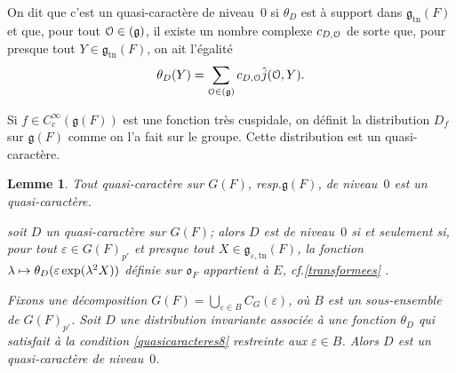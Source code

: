 \documentclass[11pt]{article}
\newcommand{\cf}{cf.\xspace}
\newcommand{\resp}{resp.\xspace}
\newcommand{\skpt}{\smallskip}
\numberwithin{equation}{section}\providecommand{\og}{«\,}\providecommand{\fg}{\,»}
\let\mathcal \EuScript
\let\oldenumerate\enumerate
\renewcommand{\enumerate}{\oldenumerate\itemindent0pt}
\newenvironment{enumeratei}
{\bgroup\def\theenumi{\roman{enumi}}\def\theenumii{\arabic{enumii}}\oldenumerate}
{\endenumerate\egroup}
\newcommand{\NoChangel}[1]{%
\expandafter\let\csname old\string#1\endcsname=#1
\let#1=\relax
\newcommand{#1}{\mathcode`l="716C\csname old\string#1\endcsname\mathcode`l="7160 }%
}
\let\epsilon\varepsilon
\newcommand\mto{\mathchoice{\longmapsto}{\mapsto}{\mapsto}{\mapsto}}
\newcommand{\frg}{\mathfrak{g}}
\newcommand{\fro}{\mathfrak{o}}
\newcommand{\rc}{\mathrm{c}}
\newcommand{\Nil}{\mathrm{Nil}} \NoChangel{\Nil}
\newcommand{\tn}{\mathrm{tn}}
\newcommand{\cO}{\mathcal{O}}
\theoremstyle{plain}
\newtheorem*{lem*}{Lemme}
\theoremstyle{definition}
\begin{document}
On dit que c'est un quasi-caractère de niveau~$0$ si $\theta_{D}$ est à support dans $\frg_{\tn}(F)$ et que, pour tout $\cO\in \Nil(\frg)$, il existe un nombre complexe $c_{D,\cO}$ de sorte que, pour presque tout $Y\in \frg_{\tn}(F)$, on ait l'égalité
\[
\theta_{D}(Y)=\sum_{\cO\in \Nil(\frg)}c_{D,\cO}\hat{j}(\cO,Y).
\]

Si $f\in C_{\rc}^{\infty}(\frg(F))$ est une fonction très cuspidale, on définit la distribution $D_{f}$ sur $\frg(F)$ comme on l'a fait sur le groupe. Cette distribution est un quasi-caractère.

\skpt
\begin{lem*}
\begin{enumeratei}
\item\label{quasicaracteresi}
Tout quasi-caractère sur $G(F)$, \resp $\frg(F)$, de niveau~$0$ est un quasi-caractère.

\item\label{quasicaracteresii}
soit $D$ un quasi-caractère sur $G(F)$; alors $D$ est de niveau~$0$ si et seulement si, pour tout $\epsilon\in G(F)_{p'}$ et presque tout $X\in \frg_{\epsilon,\tn}(F)$, la fonction $\lambda\mto \theta_{D}(\epsilon \exp(\lambda^2X))$ définie sur $\fro_{F}$ appartient à $E$, \cf \ref{transformees} .

\item\label{quasicaracteresiii}
Fixons une décomposition $G(F)=\bigcup_{\epsilon\in B}C_{G}(\epsilon)$, où $B$ est un sous-ensemble de $G(F)_{p'}$. Soit $D$ une distribution invariante associée à une fonction $\theta_{D}$ qui satisfait à la condition \eqref{quasicaracteres8} restreinte aux $\epsilon\in B$. Alors $D$ est un quasi-caractère de niveau~$0$.
\end{enumeratei}
\end{lem*}
\end{document}
